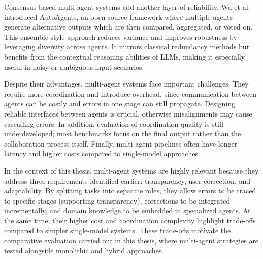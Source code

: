 Consensus-based multi-agent systems add another layer of reliability. Wu et al.\ \cite{wu2023autoagents} introduced AutoAgents, an open-source framework where multiple agents generate alternative outputs which are then compared, aggregated, or voted on. This ensemble-style approach reduces variance and improves robustness by leveraging diversity across agents. It mirrors classical redundancy methods but benefits from the contextual reasoning abilities of LLMs, making it especially useful in noisy or ambiguous input scenarios.

Despite their advantages, multi-agent systems face important challenges. They require more coordination and introduce overhead, since communication between agents can be costly and errors in one stage can still propagate. Designing reliable interfaces between agents is crucial, otherwise misalignments may cause cascading errors. In addition, evaluation of coordination quality is still underdeveloped; most benchmarks focus on the final output rather than the collaboration process itself. Finally, multi-agent pipelines often have longer latency and higher costs compared to single-model approaches.

In the context of this thesis, multi-agent systems are highly relevant because they address three requirements identified earlier: transparency, user correction, and adaptability. By splitting tasks into separate roles, they allow errors to be traced to specific stages (supporting transparency), corrections to be integrated incrementally, and domain knowledge to be embedded in specialized agents. At the same time, their higher cost and coordination complexity highlight trade-offs compared to simpler single-model systems. These trade-offs motivate the comparative evaluation carried out in this thesis, where multi-agent strategies are tested alongside monolithic and hybrid approaches.
